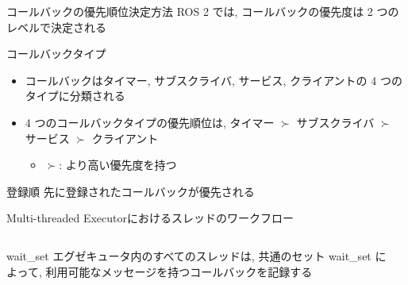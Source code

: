 \begin{frame}{コールバックの優先順位決定方法}
    ROS 2 では, コールバックの優先度は 2 つのレベルで決定される

    \begin{block}{コールバックタイプ}
        \setlength{\linewidth}{0.98\columnwidth}
        \begin{itemize}
            \item コールバックはタイマー, サブスクライバ, サービス, クライアントの 4 つのタイプに分類される
            \item 4 つのコールバックタイプの優先順位は, タイマー $\succ$ サブスクライバ $\succ$ サービス $\succ$ クライアント
                  \begin{itemize}
                      \item $\succ$: より高い優先度を持つ
                  \end{itemize}
        \end{itemize}
    \end{block}

    \begin{block}{登録順}
        先に登録されたコールバックが優先される
    \end{block}
\end{frame}

\begin{frame}{}
\end{frame}


\begin{frame}{Multi-threaded Executorにおけるスレッドのワークフロー}
    \begin{columns}
        \begin{column}{0.55\textwidth}
            \begin{block}{wait\_set}
                エグゼキュータ内のすべてのスレッドは, 共通のセット wait\_set によって, 利用可能なメッセージを持つコールバックを記録する
            \end{block}
        \end{column}
        \begin{column}{0.45\textwidth}
        \end{column}
    \end{columns}
\end{frame}


